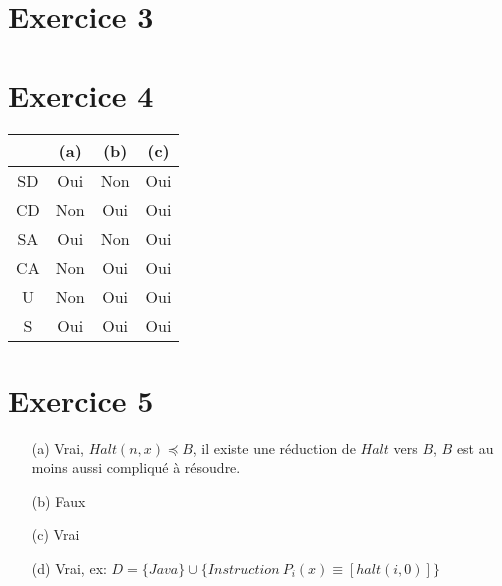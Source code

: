 \documentclass[a4paper, 11pt, onecolumn]{article}
\begin{document}
\section*{Exercice 3}

\section*{Exercice 4}

\begin{center}
\begin{tabular}{c|c|c|c}
& (a) & (b) & (c) \\
\hline
SD & Oui & Non & Oui \\
CD & Non & Oui & Oui \\
SA & Oui & Non & Oui \\
CA & Non & Oui & Oui \\
U & Non & Oui & Oui \\
S & Oui & Oui & Oui \\
\end{tabular}
\end{center}

\section*{Exercice 5}
\begin{itemize}
	\item[(a)] Vrai, $Halt(n,x) \preceq B$, il existe une réduction de $Halt$ vers $B$, $B$ est au moins aussi compliqué à résoudre.
	\item[(b)] Faux
	\item[(c)] Vrai
	\item[(d)] Vrai, ex: $D = \{Java\} \cup \{Instruction\ P_i(x)\equiv[halt(i,0)]\}$
\end{itemize}
\end{document}
